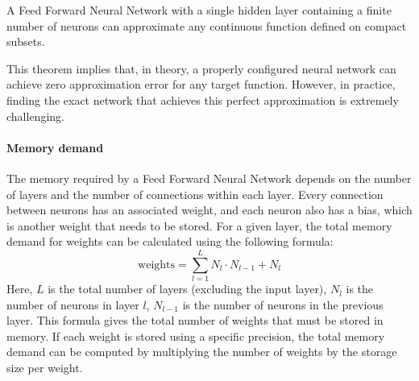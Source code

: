 \begin{theorem}
    A Feed Forward Neural Network with a single hidden layer containing a finite number of neurons can approximate any continuous function defined on compact subsets.
\end{theorem}
\noindent This theorem implies that, in theory, a properly configured neural network can achieve zero approximation error for any target function. 
However, in practice, finding the exact network that achieves this perfect approximation is extremely challenging.

\paragraph*{Memory demand}
The memory required by a Feed Forward Neural Network depends on the number of layers and the number of connections within each layer. 
Every connection between neurons has an associated weight, and each neuron also has a bias, which is another weight that needs to be stored.
For a given layer, the total memory demand for weights can be calculated using the following formula:
\[\text{weights}=\sum_{l=1}^{L}N_l\cdot N_{l-1}+N_l\]
Here, $L$ is the total number of layers (excluding the input layer), $N_l$ is the number of neurons in layer $l$, $N_{l-1}$ is the number of neurons in the previous layer. 
This formula gives the total number of weights that must be stored in memory. 
If each weight is stored using a specific precision, the total memory demand can be computed by multiplying the number of weights by the storage size per weight.